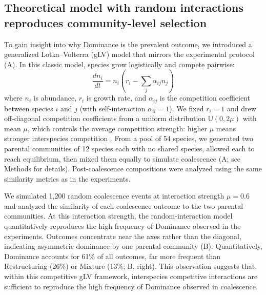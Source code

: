 \subsection{Theoretical model with random interactions reproduces community-level selection}
\label{sec:results:glv_model}
To gain insight into why Dominance is the prevalent outcome, we introduced a generalized Lotka--Volterra (gLV) model \citep{May1972, Grilli2017} that mirrors the experimental protocol (A). In this classic model, species grow logistically and compete pairwise:
\begin{equation}
\frac{dn_i}{dt} = n_i \left( r_i - \sum_j \alpha_{ij} n_j \right)
\label{eq:glv}
\end{equation}
where $n_i$ is abundance, $r_i$ is growth rate, and $\alpha_{ij}$ is the competition coefficient between species $i$ and $j$ (with self-interaction $\alpha_{ii} = 1$). We fixed $r_i = 1$ and drew off-diagonal competition coefficients from a uniform distribution $\mathbb{U}(0, 2\mu)$ with mean $\mu$, which controls the average competition strength: higher $\mu$ means stronger interspecies competition \citep{Hu2022,Hu2025}. From a pool of 54 species, we generated two parental communities of 12 species each with no shared species, allowed each to reach equilibrium, then mixed them equally to simulate coalescence (A; see Methods for details). Post-coalescence compositions were analyzed using the same similarity metrics as in the experiments. 

We simulated 1,200 random coalescence events at interaction strength $\mu = 0.6$ and analyzed the similarity of each coalescence outcome to the two parental communities. At this interaction strength, the random-interaction model quantitatively reproduces the high frequency of Dominance observed in the experiments. Outcomes concentrate near the axes rather than the diagonal, indicating asymmetric dominance by one parental community (B). Quantitatively, Dominance accounts for 61\% of all outcomes, far more frequent than Restructuring (26\%) or Mixture (13\%; B, right). This observation suggests that, within this competitive gLV framework, interspecies competitive interactions are sufficient to reproduce the high frequency of Dominance observed in coalescence.

